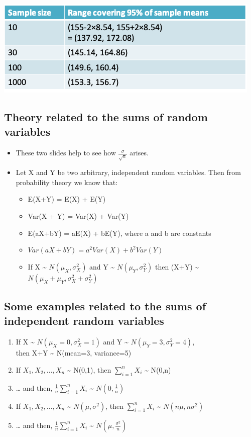 \documentclass[
]{book}
\providecommand{\tightlist}{%
  \setlength{\itemsep}{0pt}\setlength{\parskip}{0pt}}
\begin{document}
\includegraphics[width=0.5\linewidth]{./3_32}

\hypertarget{theory-related-to-the-sums-of-random-variables}{%
\subsection{Theory related to the sums of random variables}\label{theory-related-to-the-sums-of-random-variables}}

\begin{itemize}
\tightlist
\item
  These two slides help to see how \(\frac{\sigma}{\sqrt n}\) arises.
\item
  Let X and Y be two arbitrary, independent random variables. Then from probability theory we know that:

  \begin{itemize}
  \tightlist
  \item
    E(X+Y) = E(X) + E(Y)
  \item
    Var(X + Y) = Var(X) + Var(Y)
  \item
    E(aX+bY) = aE(X) + bE(Y), where a and b are constants
  \item
    \(Var(aX+bY) = a^2 Var(X) + b^2 Var(Y)\)
  \item
    If X \textasciitilde{} \(N(\mu_X,\sigma_X^2)\) and Y \textasciitilde{} \(N(\mu_Y,\sigma_Y^2)\) then (X+Y) \textasciitilde{} \(N(\mu_X+\mu_Y,\sigma_X^2+\sigma_Y^2)\)
  \end{itemize}
\end{itemize}

\hypertarget{some-examples-related-to-the-sums-of-independent-random-variables}{%
\subsection{Some examples related to the sums of independent random variables}\label{some-examples-related-to-the-sums-of-independent-random-variables}}

\begin{enumerate}
\def\labelenumi{\arabic{enumi}.}
\item
  If X \textasciitilde{} \(N(\mu_X=0,\sigma_X^2=1)\) and Y \textasciitilde{} \(N(\mu_Y=3,\sigma_Y^2=4)\),\\
  then X+Y \textasciitilde{} N(mean=3, variance=5)
\item
  If \(X_1,X_2,...,X_n\) \textasciitilde{} N(0,1), then \(\sum_{i=1}^nX_i\) \textasciitilde{} N(0,n)
\item
  \ldots{} and then, \(\frac{1}{n}\sum_{i=1}^nX_i\) \textasciitilde{} \(N(0,\frac{1}{n})\)
\item
  If \(X_1,X_2,...,X_n\) \textasciitilde{} \(N(\mu,\sigma^2)\), then \(\sum_{i=1}^nX_i\) \textasciitilde{} \(N(n\mu,n\sigma^2)\)
\item
  \ldots{} and then, \(\frac{1}{n}\sum_{i=1}^nX_i\) \textasciitilde{} \(N(\mu,\frac{\sigma^2}{n})\)
\end{enumerate}
\end{document}
